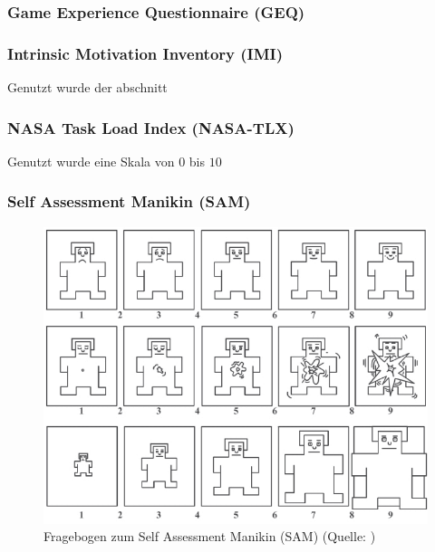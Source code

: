 \documentclass[
	12pt,
	a4paper,
	bibtotoc,
	cleardoubleempty, 
	idxtotoc,
	ngerman,
	openright
	final,
	listof=nochaptergap,
	]{scrbook}
\begin{document}
\begin{appendices}


\subsubsection{Game Experience Questionnaire (GEQ)}\label{sec:append_study_xp}



\subsubsection{Intrinsic Motivation Inventory (IMI)}\label{sec:append_study_imi}

Genutzt wurde der abschnitt 


\subsubsection{NASA Task Load Index (NASA-TLX)}\label{sec:append_study_tlx}

Genutzt wurde eine Skala von $0$ bis $10$



\subsubsection{Self Assessment Manikin (SAM)}\label{sec:append_study_sam}

\begin{figure}[ht]
\centering
\includegraphics[width=1\linewidth]{content/attachments/questtionaires/Self-Assessment-Manikin-SAM-for-valence-arousal-and-dominance-The-five.png}
\caption{Fragebogen zum Self Assessment Manikin (SAM) (Quelle: \citealp{soares_affective_2013})}
\label{fig:append_sam}
\end{figure}


\end{appendices}
\end{document}
